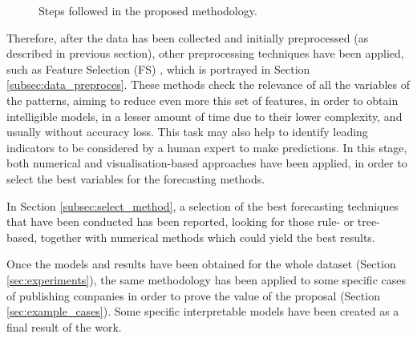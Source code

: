\documentclass[a4paper,10pt,twocolumn,preprint,3p]{elsarticle}
\begin{document}
\begin{figure}[!ht] 
\begin{center}
\caption{Steps followed in the proposed methodology.}
\label{fig:methodology}
\end{center}
\end{figure}


Therefore, after the data has been collected and initially preprocessed (as described in previous section), other preprocessing techniques have been applied, such as Feature Selection (FS) \cite{kittler1986feature}, which is portrayed in Section \ref{subsec:data_preproces}. These methods check the relevance of all the variables of the patterns, aiming to reduce even more this set of features, in order to obtain intelligible models, in a lesser amount of time due to their lower complexity, and usually without accuracy loss.
This task may also help to identify leading indicators to be considered 
by a human expert to make predictions.
In this stage, both numerical and visualisation-based approaches have been 
applied, in order to select the best variables for the forecasting methods.  

In Section \ref{subsec:select_method}, a selection of the best forecasting techniques that have been conducted has been reported, looking for those rule- or tree-based, together with numerical methods which could yield the best results. 

Once the models and results have been obtained for the whole dataset (Section \ref{sec:experiments}), the same methodology has been applied to some specific cases of publishing companies in order to prove the value of the proposal (Section \ref{sec:example_cases}).
Some specific interpretable models have been created as a final result of the work. 



\end{document}
